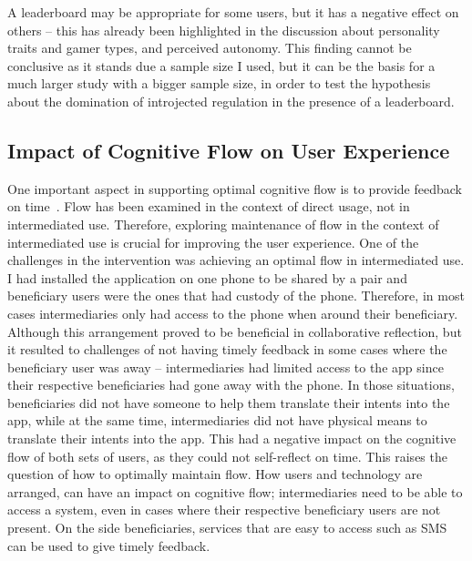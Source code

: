 A leaderboard may be appropriate for some users, but it has a negative effect on others -- this has already been highlighted in the discussion about personality traits and gamer types, and perceived autonomy. This finding cannot be conclusive as it stands due a sample size I used, but it can be the basis for a much larger study with a bigger sample size, in order to test the hypothesis about the domination of introjected regulation in the presence of a leaderboard.

\subsection{Impact of Cognitive Flow on User Experience}
One important aspect in supporting optimal cognitive flow is to provide feedback on time~\citep{csikszentmihalyiflow}. Flow has been examined in the context of direct usage, not in intermediated use. Therefore, exploring maintenance of flow in the context of intermediated use is crucial for improving the user experience. One of the challenges in the intervention was achieving an optimal flow in intermediated use. I had installed the application on one phone to be shared by a pair and beneficiary users were the ones that had custody of the phone. Therefore, in most cases intermediaries only had access to the phone when around their beneficiary. Although this arrangement proved to be beneficial in collaborative reflection, but it resulted to challenges of not having timely feedback in some cases where the beneficiary user was away -- intermediaries had limited access to the app since their respective beneficiaries had gone away with the phone. In those situations, beneficiaries did not have someone to help them translate their intents into the app, while at the same time, intermediaries did not have physical means to translate their intents into the app. This had a negative impact on the cognitive flow of both sets of users, as they could not self-reflect on time. This raises the question of how to optimally maintain flow. How users and technology are arranged, can have an impact on cognitive flow; intermediaries need to be able to access a system, even in cases where their respective beneficiary users are not present. On the side beneficiaries, services that are easy to access such as SMS can be used to give timely feedback.

